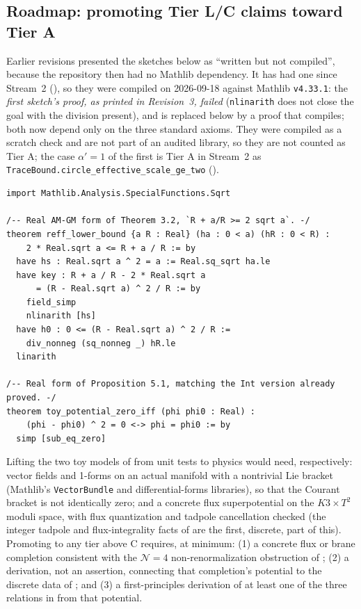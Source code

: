 \documentclass[11pt,a4paper]{article}
\theoremstyle{remark}
\begin{document}
\subsection{Roadmap: promoting Tier L/C claims toward Tier A}
Earlier revisions presented the sketches below as ``written but not compiled'', because the
repository then had no Mathlib dependency. It has had one since Stream~2 (), so they
were compiled on 2026-09-18 against Mathlib \texttt{v4.33.1}: the \emph{first sketch's proof, as printed
in Revision~3, failed} (\texttt{nlinarith} does not close the goal with the division present), and is
replaced below by a proof that compiles; both now depend only on the three standard axioms. They were
compiled as a scratch check and are not part of an audited library, so they are not counted as Tier A;
the case $\alpha'=1$ of the first is Tier A in Stream~2 as
\texttt{TraceBound.circle\_\discretionary{}{}{}effective\_\discretionary{}{}{}scale\_\discretionary{}{}{}ge\_\discretionary{}{}{}two}
().
\begin{verbatim}
import Mathlib.Analysis.SpecialFunctions.Sqrt

/-- Real AM-GM form of Theorem 3.2, `R + a/R >= 2 sqrt a`. -/
theorem reff_lower_bound {a R : Real} (ha : 0 < a) (hR : 0 < R) :
    2 * Real.sqrt a <= R + a / R := by
  have hs : Real.sqrt a ^ 2 = a := Real.sq_sqrt ha.le
  have key : R + a / R - 2 * Real.sqrt a
      = (R - Real.sqrt a) ^ 2 / R := by
    field_simp
    nlinarith [hs]
  have h0 : 0 <= (R - Real.sqrt a) ^ 2 / R :=
    div_nonneg (sq_nonneg _) hR.le
  linarith

/-- Real form of Proposition 5.1, matching the Int version already proved. -/
theorem toy_potential_zero_iff (phi phi0 : Real) :
    (phi - phi0) ^ 2 = 0 <-> phi = phi0 := by
  simp [sub_eq_zero]
\end{verbatim}
Lifting the two toy models of  from unit tests to physics would
need, respectively: vector fields and 1-forms on an actual manifold with a nontrivial Lie bracket
(Mathlib's \texttt{VectorBundle} and differential-forms libraries), so that the Courant bracket is not
identically zero; and a concrete flux superpotential on the $K3\times T^2$ moduli space, with flux
quantization and tadpole cancellation checked (the integer tadpole and flux-integrality facts of
 are the first, discrete, part of this).
Promoting  to any tier above C requires, at minimum: (1) a concrete flux or
brane completion consistent with the $\mathcal{N}=4$ non-renormalization obstruction of
; (2) a derivation, not an assertion, connecting that completion's
potential to the discrete data of ; and (3) a first-principles derivation of at least
one of the three relations in  from that potential.
\end{document}
